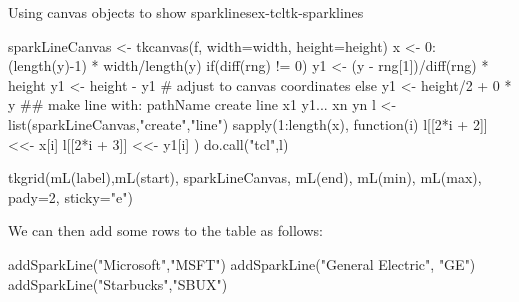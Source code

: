 \begin{example}{Using canvas objects to show sparklines}{ex-tcltk-sparklines}
\begin{Schunk}
\begin{Sinput}
{   sparkLineCanvas <- tkcanvas(f, width=width, height=height)
   x <- 0:(length(y)-1) * width/length(y)
   if(diff(rng) != 0) {
     y1 <- (y - rng[1])/diff(rng) * height
     y1 <- height - y1   # adjust to canvas coordinates
   } else {
     y1 <- height/2 + 0 * y
   }
   ## make line with: pathName create line x1 y1... xn yn 
   l <- list(sparkLineCanvas,"create","line")
   sapply(1:length(x), function(i) {
     l[[2*i + 2]] <<- x[i]
     l[[2*i + 3]] <<- y1[i]
   })
   do.call("tcl",l)
 
   tkgrid(mL(label),mL(start), sparkLineCanvas, 
          mL(end), mL(min), mL(max), pady=2, sticky="e")
 }
\end{Sinput}
\end{Schunk}

We can then add some rows to the table as follows:
\begin{Schunk}
\begin{Sinput}
 addSparkLine("Microsoft","MSFT")
 addSparkLine("General Electric", "GE")
 addSparkLine("Starbucks","SBUX")
\end{Sinput}
\end{Schunk}
\end{example}

